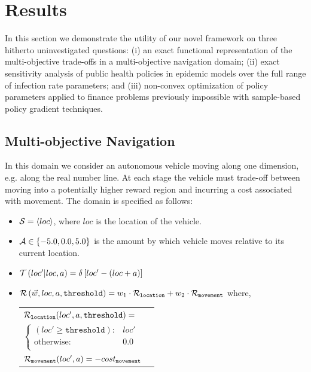 \section{Results}
\label{sec:results}

In this section we demonstrate the utility of our novel framework on three hitherto uninvestigated questions: (i) an exact functional representation of the multi-objective trade-offs in a multi-objective navigation domain; (ii) exact sensitivity analysis of public health policies in epidemic models over the full range of infection rate parameters; and (iii) non-convex optimization of policy parameters applied to finance problems previously impossible with sample-based policy gradient techniques.

\subsection{Multi-objective Navigation}
\label{sec:results_navigation}

In this domain we consider an autonomous vehicle moving along one dimension, e.g. along the real number line. At each stage the vehicle must trade-off between moving into a potentially higher reward region and incurring a cost associated with movement. The domain is specified as follows:
\begin{itemize}
    \item {\footnotesize $ \mathcal{S} = \left\langle loc \right\rangle$}, where $ loc $ is the location of the vehicle.
    \item {\footnotesize $ \mathcal{A} \in \left\lbrace -5.0, 0.0, 5.0 \right\rbrace $} is the amount by which vehicle moves relative to its current location.
    \item {\footnotesize $ \mathcal{T}\left( loc' | loc, a \right) = \delta \left[ loc' - (loc + a) \right] $}
    \item {\footnotesize $ \mathcal{R}\left(\vec{w}, loc, a, \mathtt{threshold} \right) = w_1 \cdot \mathcal{R}_{\mathtt{location}} + w_2 \cdot \mathcal{R}_{\mathtt{movement}} $} where, \\
    {\footnotesize 
        \abovedisplayskip=10pt
        \belowdisplayskip=0pt
        \renewcommand{\arraystretch}{1.5}
        \begin{tabular}{ll}    
            $ \mathcal{R}_{\mathtt{location}}(loc', a, \mathtt{threshold}) = $ &  $ $ \\
                \qquad $ \begin{cases}
                (loc' \geq \mathtt{threshold}) : & loc' \\
                \text{otherwise} : & 0.0 \\
                \end{cases} $ & $ $\\
            $ \mathcal{R}_{\mathtt{movement}}(loc', a) = -cost_{\mathtt{movement}} $ & $ $ \\                        
        \end{tabular}
    }    
\end{itemize} 

